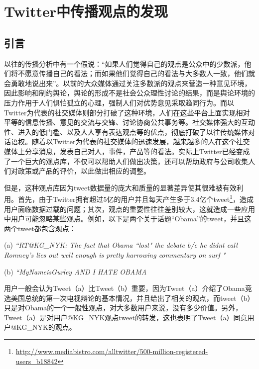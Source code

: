 \chapter{Twitter中传播观点的发现}
\label{ROR}

\section{引言}
\label{ROR_Intr}
以往的传播分析中有一个假说：“如果人们觉得自己的观点是公众中的少数派，他们将不愿意传播自己的看法；而如果他们觉得自己的看法与大多数人一致，他们就会勇敢地说出来”。以前的大众媒体通过关注多数派的观点来营造一种意见环境，因此影响和制约舆论，舆论的形成不是社会公众理性讨论的结果，而是舆论环境的压力作用于人们惧怕孤立的心理，强制人们对优势意见采取趋同行为。而以Twitter为代表的社交媒体则部分打破了这种环境，人们在这些平台上面实现相对平等的信息传播、意见的交流与交锋、讨论协商公共事务等。社交媒体强大的互动性、进入的低门槛、以及人人享有表达观点等的优点，彻底打破了以往传统媒体对话语权。随着以Twitter为代表的社交媒体的迅速发展，越来越多的人在这个社交媒体上分享消息，发表自己对人，事件，产品等的看法。实际上Twitter已经变成了一个巨大的观点库，不仅可以帮助人们做出决策，还可以帮助政府与公司收集人们对政策或产品的评价，以此做出相应的调整。

但是，这种观点库因为tweet数据量的庞大和质量的显著差异使其很难被有效利用。首先，由于Twitter拥有超过5亿的用户并且每天产生多于3.4亿个tweet\footnote{\url{http://www.mediabistro.com/alltwitter/500-million-registered-users_b18842}}，造成用户面临数据过载的问题；其次，观点的重要性往往差别较大，这就造成一些应用中用户可能忽略某些观点。例如，以下是两个关于话题“Obama”的tweet，并且这两个tweet都包含观点：
 \begin{description}
\item{(a)} \emph{``RT@KG\_NYK: The fact that Obama ``lost" the debate b/c he didnt call Romney's lies out well enough is pretty harrowing commentary on surf "}
\item{(b)} \emph{``MyNameisGurley AND I HATE OBAMA}
  \end{description}  
用户一般会认为Tweet（a）比Tweet（b）重要，因为Tweet（a）介绍了Obama竞选美国总统的第一次电视辩论的基本情况，并且给出了相关的观点，而tweet（b）只是对Obama的一个一般性观点，对大多数用户来说，没有多少价值。另外，Tweet（a）是对用户@KG\_NYK观点tweet的转发，这也表明了Tweet（a）同意用户@KG\_NYK的观点。

